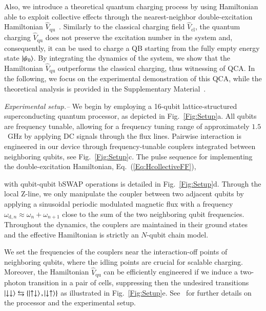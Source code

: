 \documentclass[aps,prl,epsfigure,twocolumn,superscriptaddress]{revtex4-2}
\newcommand{\1}{\mathbbm{1}}
\newcommand{\SubFig}[2]{\ref{#1}{\color{blue}#2}}
\newcommand{\RefB}[1]{{\color{black}#1}}
\newcommand{\RefC}[1]{{\color{black}#1}}
\begin{document}
	Also, we introduce a theoretical quantum charging process by using Hamiltonian able to exploit collective effects through the nearest-neighbor double-excitation Hamiltonian $\hat{V}_{\mathrm{qu}}$~\cite{Ramanathan:03,Ramanathan:11}. Similarly to the classical charging field $\hat{V}_{\mathrm{cl}}$, the quantum charging $\hat{V}_{\mathrm{qu}}$ does not preserve the excitation number in the system and, consequently, it can be used to charge a QB starting from the fully empty energy state $\ket{\psi_{0}}$. By integrating the dynamics of the system, we show that the Hamiltonian $\hat{V}_{\mathrm{qu}}$ outperforms the classical charging, thus witnessing \RefC{of QCA}.  In the following, we focus on the experimental demonstration of this QCA, while the theoretical analysis is provided in the Supplementary Material~\cite{SM}.

	\emph{Experimental setup.--}
	We begin by employing a 16-qubit lattice-structured superconducting quantum processor, as depicted in Fig.~\SubFig{Fig:Setup}{a}. All qubits are frequency tunable, allowing for a frequency tuning range of approximately $1.5$~GHz by applying DC signals through the flux lines. Pairwise interaction is engineered in our device through frequency-tunable couplers integrated between neighboring qubits, see Fig.~\SubFig{Fig:Setup}{c}. The pulse sequence for implementing the double-excitation Hamiltonian, Eq.~(\ref{Eq:HcollectiveFF}),
	\RefB{
		with qubit-qubit bSWAP operations is detailed in Fig.~\SubFig{Fig:Setup}{d}. Through the local Z-line, we only manipulate the coupler between two adjacent qubits by applying a sinusoidal periodic modulated magnetic flux with a frequency $\omega_{\mathrm{d},n} \approx \omega_{n} + \omega_{n+1}$ close to the sum of the two neighboring qubit frequencies. Throughout the dynamics, the couplers are maintained in their ground states ~\cite{Marco:17,Ganzhorn:20,Bruno:22} and the effective Hamiltonian is strictly \RefC{an $N$-qubit} chain model.

	}
	We set the frequencies of the couplers near the interaction-off points of neighboring qubits, where the idling points are crucial for scalable charging. Moreover, the Hamiltonian $\hat{V}_{\mathrm{qu}}$ can be efficiently engineered if we induce a two-photon transition in a pair of cells, suppressing then the undesired transitions $\ket{\downarrow\downarrow} \leftrightarrows \{\ket{\uparrow\downarrow},\ket{\downarrow\uparrow}\}$ as illustrated in  Fig.~\SubFig{Fig:Setup}{e}. See~\cite{SM} for further details on the processor and the experimental setup.
\end{document}
